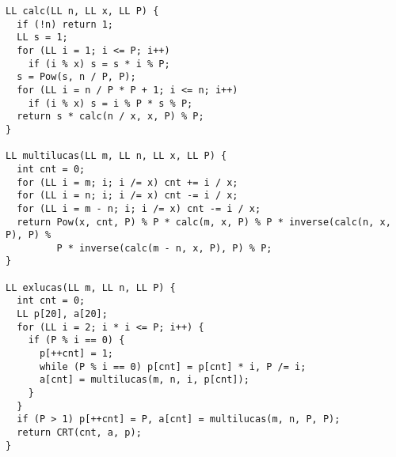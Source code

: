 \begin{verbatim}
LL calc(LL n, LL x, LL P) {
  if (!n) return 1;
  LL s = 1;
  for (LL i = 1; i <= P; i++)
    if (i % x) s = s * i % P;
  s = Pow(s, n / P, P);
  for (LL i = n / P * P + 1; i <= n; i++)
    if (i % x) s = i % P * s % P;
  return s * calc(n / x, x, P) % P;
}

LL multilucas(LL m, LL n, LL x, LL P) {
  int cnt = 0;
  for (LL i = m; i; i /= x) cnt += i / x;
  for (LL i = n; i; i /= x) cnt -= i / x;
  for (LL i = m - n; i; i /= x) cnt -= i / x;
  return Pow(x, cnt, P) % P * calc(m, x, P) % P * inverse(calc(n, x, P), P) %
         P * inverse(calc(m - n, x, P), P) % P;
}

LL exlucas(LL m, LL n, LL P) {
  int cnt = 0;
  LL p[20], a[20];
  for (LL i = 2; i * i <= P; i++) {
    if (P % i == 0) {
      p[++cnt] = 1;
      while (P % i == 0) p[cnt] = p[cnt] * i, P /= i;
      a[cnt] = multilucas(m, n, i, p[cnt]);
    }
  }
  if (P > 1) p[++cnt] = P, a[cnt] = multilucas(m, n, P, P);
  return CRT(cnt, a, p);
}
\end{verbatim}